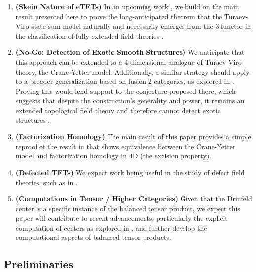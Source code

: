 \begin{enumerate}
  \item \textbf{(Skein Nature of eTFTs)} In an upcoming work
        \cite{guu/tv-as-3-functor}, we build on the main result presented here
        to prove the long-anticipated theorem that the Turaev-Viro state sum
        model \cite{viro/turaev-viro-model} naturally and necessarily emerges
        from the 3-functor in the classification of fully extended field
        theories \cite{lurie/tqft} \cite{douglas/dualizable-tensor-categories}.
  \item \textbf{(No-Go: Detection of Exotic Smooth Structures)} We anticipate
        that this approach can be extended to a $4$-dimensional analogue of
        Turaev-Viro theory, the Crane-Yetter model. Additionally, a similar
        strategy should apply to a broader generalization based on fusion
        2-categories, as explored in \cite{douglas/fusion-2-cat-4d-tqft}.
        Proving this would lend support to the conjecture proposed there,
        which suggests that despite the construction's generality and power,
        it remains an extended topological field theory and therefore cannot
        detect exotic structures \cite{reutter/no-go-exotic}.
  \item \textbf{(Factorization Homology)} The main result of this paper
        provides a simple reproof of the result in
        \cite{kirillov/fact-homo-4d-tqft} that shows equivalence between the
        Crane-Yetter model and factorization homology
        \cite{ayala/factorization-homology} in $4$D (the excision property).
  \item \textbf{(Defected TFTs)} We expect work being useful in the study of
        defect field theories, such as in \cite{meusburger/defect-tv}.
  \item \textbf{(Computations in Tensor / Higher Categories)} Given that the
        Drinfeld center is a specific instance of the balanced tensor product,
        we expect this paper will contribute to recent advancements,
        particularly the explicit computation of centers as explored in
        \cite{maurer/computing-center}, and further develop the computational
        aspects of balanced tensor products.
\end{enumerate}


\subsection{Preliminaries}\label{subsection/preliminaries}

